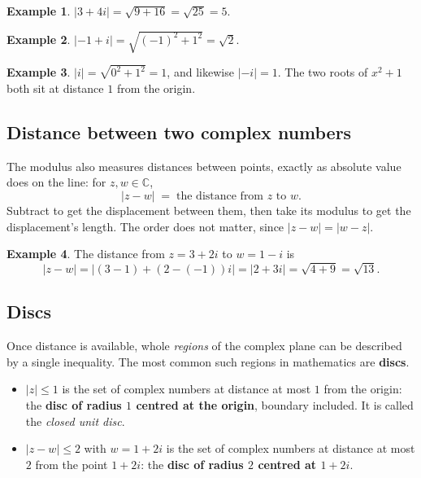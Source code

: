 \documentclass[11pt]{article}
\theoremstyle{definition}
\newtheorem{ex}{Example}
\theoremstyle{remark}
\newcommand{\C}{\mathbb{C}}
\begin{document}
\begin{ex}
$\lvert 3+4i\rvert=\sqrt{9+16}=\sqrt{25}=5$.
\end{ex}

\begin{ex}
$\lvert -1+i\rvert=\sqrt{(-1)^{2}+1^{2}}=\sqrt{2}$.
\end{ex}

\begin{ex}
$\lvert i\rvert=\sqrt{0^{2}+1^{2}}=1$, and likewise $\lvert -i\rvert=1$. The two
roots of $x^{2}+1$ both sit at distance $1$ from the origin.
\end{ex}

\subsection{Distance between two complex numbers}
The modulus also measures distances between points, exactly as absolute value
does on the line: for $z,w\in\C$,
\[
  \lvert z-w\rvert
  \;=\;\text{the distance from } z \text{ to } w .
\]
Subtract to get the displacement between them, then take its modulus to get the
displacement's length. The order does not matter, since $\lvert z-w\rvert
=\lvert w-z\rvert$.

\begin{ex}
The distance from $z=3+2i$ to $w=1-i$ is
\[
  \lvert z-w\rvert = \lvert (3-1)+(2-(-1))i\rvert = \lvert 2+3i\rvert
  = \sqrt{4+9} = \sqrt{13}.
\]
\end{ex}

\subsection{Discs}
Once distance is available, whole \emph{regions} of the complex plane can be
described by a single inequality. The most common such regions in mathematics
are \textbf{discs}.

\begin{itemize}[leftmargin=1.4em,itemsep=4pt]
  \item $\lvert z\rvert\le 1$ is the set of complex numbers at distance at most
        $1$ from the origin: the \textbf{disc of radius $1$ centred at the
        origin}, boundary included. It is called the \emph{closed unit disc}.
  \item $\lvert z-w\rvert\le 2$ with $w=1+2i$ is the set of complex numbers at
        distance at most $2$ from the point $1+2i$: the \textbf{disc of radius
        $2$ centred at $1+2i$}.
\end{itemize}
\end{document}
